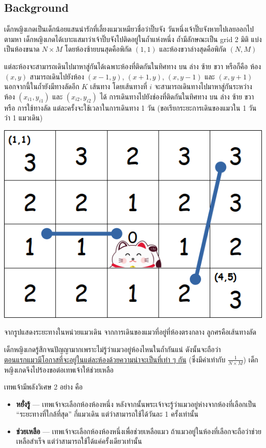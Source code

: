 
\subsection*{\sectionfont\upshape Background}

เด็กหญิงเกดเป็นเด็กน้อยแสนน่ารักที่เลี้ยงแมวเหมียวชื่อว่าปิ๊บจัง วันหนึ่งเจ้าปิ๊บจังหายไปเลยออกไปตามหา 
เด็กหญิงเกดได้เบาะแสมาว่าเจ้าปิ๊บจังไปติดอยู่ในถ้ำแห่งหนึ่ง ถ้ำมีลักษณะเป็น grid 2 มิติ 
แบ่งเป็นห้องขนาด $N \times M$ โดยห้องซ้ายบนสุดคือพิกัด $(1,1)$ และห้องขวาล่างสุดคือพิกัด $(N,M)$

แต่ละห้องจะสามารถเดินไปมาหาสู่กันได้เฉพาะห้องที่ติดกันในทิศทาง บน ล่าง ซ้าย ขวา หรือก็คือ 
ห้อง $(x,y)$ สามารถเดินไปยังห้อง $(x-1,y)$, $(x+1,y)$, $(x,y-1)$ และ $(x,y+1)$ 
นอกจากนี้ในถ้ำยังมีทางลัดอีก $K$ เส้นทาง โดยเส้นทางที่ $i$ 
จะสามารถเดินทางไปมาหาสู่กันระหว่างห้อง $(x_{i1},y_{i1})$ และ $(x_{i2},y_{i2})$ ได้\;
การเดินทางไปยังช่องที่ติดกันในทิศทาง บน ล่าง ซ้าย ขวา หรือ การใช้ทางลัด 
แต่ละครั้งจะใช้เวลาในการเดินทาง 1 วัน (ขอเรียกระยะการเดินของแมวใน 1 วันว่า 1 แมวเดิน)

\begin{center}
    \bigskip
    \includegraphics[width=0.7\linewidth]{figures/coding_national_findingpeepchan_01.png}
\end{center}

จากรูปแสดงระยะทางในหน่วยแมวเดิน จากการเดินของแมวที่อยู่ที่ห้องตรงกลาง ลูกศรคือเส้นทางลัด

เด็กหญิงเกดรู้สึกจนปัญญามากเพราะไม่รู้ว่าแมวอยู่ห้องไหนในถ้ำกันแน่ ดังนั้นจะถือว่า \\
\uline{ตอนแรกแมวมีโอกาสที่จะอยู่ในแต่ละห้องด้วยความน่าจะเป็นที่เท่า ๆ กัน} 
(ซึ่งมีค่าเท่ากับ $\frac{1}{N \times M}$) เด็กหญิงเกดจึงไปร้องขอต่อเทพเจ้าให้ช่วยเหลือ

\medskip
เทพเจ้ามีพลังวิเศษ 2 อย่าง คือ
\begin{itemize}
\item \textbf{หยั่งรู้} --- เทพเจ้าจะเลือกห้องห้องหนึ่ง หลังจากนั้นพระเจ้าจะรู้ว่าแมวอยู่ห่างจากห้องที่เลือกเป็น
    ``ระยะทางที่ใกล้ที่สุด'' กี่แมวเดิน แต่ว่าสามารถใช้ได้วันละ 1 ครั้งเท่านั้น
\item \textbf{ช่วยเหลือ} --- เทพเจ้าจะเลือกห้องห้องหนึ่งเพื่อช่วยเหลือแมว 
    ถ้าแมวอยู่ในห้องที่เลือกจะถือว่าช่วยเหลือสำเร็จ แต่ว่าสามารถใช้ได้แค่ครั้งเดียวเท่านั้น
\end{itemize}

